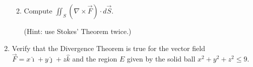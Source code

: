 \documentclass[12pt]{article}
\newcommand{\points}[1]{\marginpar{\hspace{24pt}[#1]}}
\newcommand{\di}{\displaystyle}
\begin{document}
\begin{enumerate}
\begin{enumerate}
\newpage

\item Compute $\di \iint_S (\nabla\times \vec{F})\cdot d\vec{S}$. \points{7}

\noindent (Hint: use Stokes' Theorem twice.)

\end{enumerate}
\newpage

\item Verify that the Divergence Theorem is true for the vector field $\vec{F} = x\hat{\imath}+y\hat{\jmath}+z\hat{k}$ and the region $E$ given by the solid ball $x^2+y^2+z^2\leq 9$. \points{12}

\end{enumerate}
\end{document}
